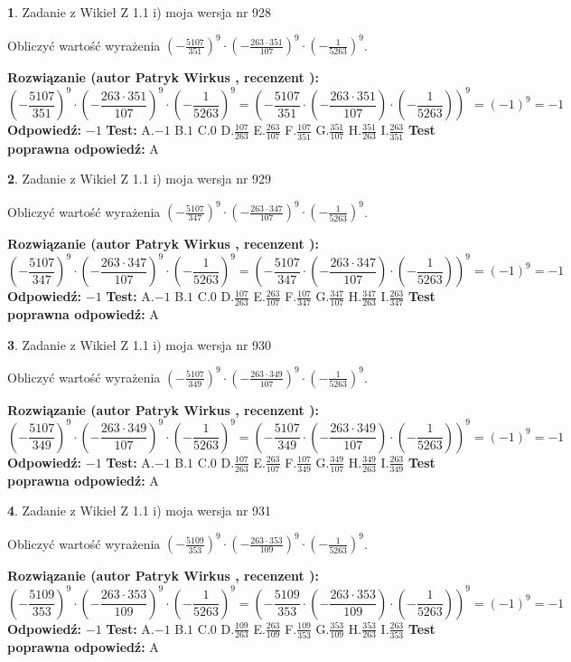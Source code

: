 \documentclass[12pt, a4paper]{article}
\theoremstyle{definition} %
\newtheorem{zad}{}
\newcommand{\zadStart}[1]{\begin{zad}#1\newline}
\newcommand{\zadStop}{\end{zad}}
\newcommand{\rozwStart}[2]{\noindent \textbf{Rozwiązanie (autor #1 , recenzent #2): }\newline}
\newcommand{\rozwStop}{\newline}
\newcommand{\odpStart}{\noindent \textbf{Odpowiedź:}\newline}
\newcommand{\odpStop}{\newline}
\newcommand{\testStart}{\noindent \textbf{Test:}\newline}
\newcommand{\testStop}{\newline}
\newcommand{\kluczStart}{\noindent \textbf{Test poprawna odpowiedź:}\newline}
\newcommand{\kluczStop}{\newline}
\begin{document}
\zadStart{Zadanie z Wikieł Z 1.1 i) moja wersja nr 928}

Obliczyć wartość wyrażenia $(-\frac{5107}{351})^{9} \cdot (-\frac{263 \cdot 351}{107})^{9} \cdot (-\frac{1}{5263})^{9}$.
\zadStop
\rozwStart{Patryk Wirkus}{}
$$(-\frac{5107}{351})^{9} \cdot (-\frac{263 \cdot 351}{107})^{9} \cdot (-\frac{1}{5263})^{9} = (-\frac{5107}{351} \cdot (-\frac{263 \cdot 351}{107}) \cdot (-\frac{1}{5263}))^{9} = (-1)^{9} = -1$$
\rozwStop
\odpStart
$-1$
\odpStop
\testStart
A.$-1$ B.$1$ C.$0$ D.$\frac{107}{263}$ E.$\frac{263}{107}$
F.$\frac{107}{351}$ G.$\frac{351}{107}$
H.$\frac{351}{263}$
I.$\frac{263}{351}$
\testStop
\kluczStart
A
\kluczStop



\zadStart{Zadanie z Wikieł Z 1.1 i) moja wersja nr 929}

Obliczyć wartość wyrażenia $(-\frac{5107}{347})^{9} \cdot (-\frac{263 \cdot 347}{107})^{9} \cdot (-\frac{1}{5263})^{9}$.
\zadStop
\rozwStart{Patryk Wirkus}{}
$$(-\frac{5107}{347})^{9} \cdot (-\frac{263 \cdot 347}{107})^{9} \cdot (-\frac{1}{5263})^{9} = (-\frac{5107}{347} \cdot (-\frac{263 \cdot 347}{107}) \cdot (-\frac{1}{5263}))^{9} = (-1)^{9} = -1$$
\rozwStop
\odpStart
$-1$
\odpStop
\testStart
A.$-1$ B.$1$ C.$0$ D.$\frac{107}{263}$ E.$\frac{263}{107}$
F.$\frac{107}{347}$ G.$\frac{347}{107}$
H.$\frac{347}{263}$
I.$\frac{263}{347}$
\testStop
\kluczStart
A
\kluczStop



\zadStart{Zadanie z Wikieł Z 1.1 i) moja wersja nr 930}

Obliczyć wartość wyrażenia $(-\frac{5107}{349})^{9} \cdot (-\frac{263 \cdot 349}{107})^{9} \cdot (-\frac{1}{5263})^{9}$.
\zadStop
\rozwStart{Patryk Wirkus}{}
$$(-\frac{5107}{349})^{9} \cdot (-\frac{263 \cdot 349}{107})^{9} \cdot (-\frac{1}{5263})^{9} = (-\frac{5107}{349} \cdot (-\frac{263 \cdot 349}{107}) \cdot (-\frac{1}{5263}))^{9} = (-1)^{9} = -1$$
\rozwStop
\odpStart
$-1$
\odpStop
\testStart
A.$-1$ B.$1$ C.$0$ D.$\frac{107}{263}$ E.$\frac{263}{107}$
F.$\frac{107}{349}$ G.$\frac{349}{107}$
H.$\frac{349}{263}$
I.$\frac{263}{349}$
\testStop
\kluczStart
A
\kluczStop



\zadStart{Zadanie z Wikieł Z 1.1 i) moja wersja nr 931}

Obliczyć wartość wyrażenia $(-\frac{5109}{353})^{9} \cdot (-\frac{263 \cdot 353}{109})^{9} \cdot (-\frac{1}{5263})^{9}$.
\zadStop
\rozwStart{Patryk Wirkus}{}
$$(-\frac{5109}{353})^{9} \cdot (-\frac{263 \cdot 353}{109})^{9} \cdot (-\frac{1}{5263})^{9} = (-\frac{5109}{353} \cdot (-\frac{263 \cdot 353}{109}) \cdot (-\frac{1}{5263}))^{9} = (-1)^{9} = -1$$
\rozwStop
\odpStart
$-1$
\odpStop
\testStart
A.$-1$ B.$1$ C.$0$ D.$\frac{109}{263}$ E.$\frac{263}{109}$
F.$\frac{109}{353}$ G.$\frac{353}{109}$
H.$\frac{353}{263}$
I.$\frac{263}{353}$
\testStop
\kluczStart
A
\kluczStop
\end{document}

